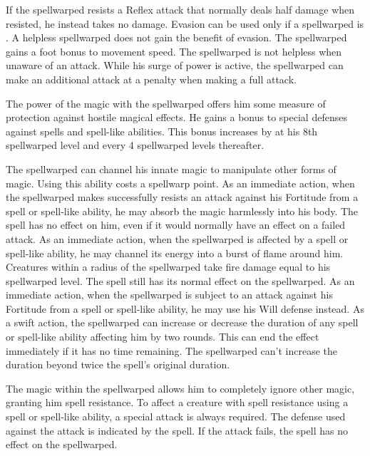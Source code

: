  If the spellwarped resists a Reflex attack that normally deals half damage when resisted, he instead takes no damage. Evasion can be used only if a spellwarped is \unencumbered. A helpless spellwarped does not gain the benefit of evasion.
 The spellwarped gains a  foot bonus to movement speed.
 The spellwarped is not helpless when unaware of an attack.
 While his surge of power is active, the spellwarped can make an additional attack at a  penalty when making a full attack.

 The power of the magic with the spellwarped offers him some measure of protection against hostile magical effects. He gains a  bonus to special defenses against spells and spell-like abilities. This bonus increases by  at his 8th spellwarped level and every 4 spellwarped levels thereafter.

 The spellwarped can channel his innate magic to manipulate other forms of magic. Using this ability costs a spellwarp point. 
 As an immediate action, when the spellwarped makes successfully resists an attack against his Fortitude from a spell or spell-like ability, he may absorb the magic harmlessly into his body. The spell has no effect on him, even if it would normally have an effect on a failed attack.
 As an immediate action, when the spellwarped is affected by a spell or spell-like ability, he may channel its energy into a burst of flame around him. Creatures within a \areasmall radius of the spellwarped take fire damage equal to his spellwarped level. The spell still has its normal effect on the spellwarped.
 As an immediate action, when the spellwarped is subject to an attack against his Fortitude from a spell or spell-like ability, he may use his Will defense instead.
 As a swift action, the spellwarped can increase or decrease the duration of any spell or spell-like ability affecting him by two rounds. This can end the effect immediately if it has no time remaining. The spellwarped can't increase the duration beyond twice the spell's original duration.

 The magic within the spellwarped allows him to completely ignore other magic, granting him spell resistance. To affect a creature with spell resistance using a spell or spell-like ability, a special attack is always required. The defense used against the attack is indicated by the spell. If the attack fails, the spell has no effect on the spellwarped.

